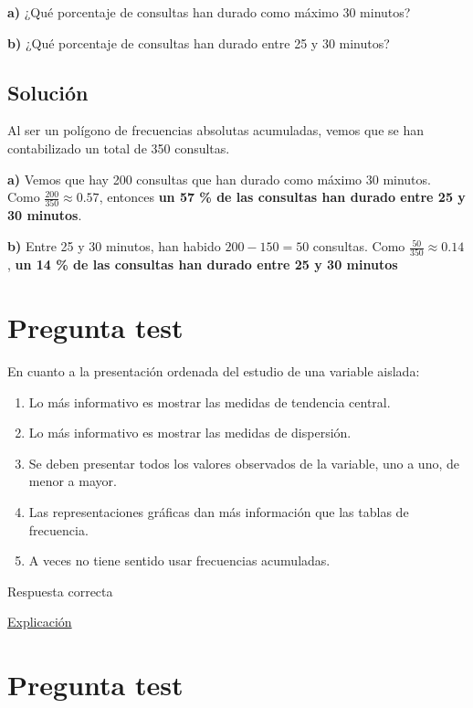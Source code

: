 \documentclass[
]{book}
\providecommand{\tightlist}{%
  \setlength{\itemsep}{0pt}\setlength{\parskip}{0pt}}
\begin{document}
\textbf{a)} ¿Qué porcentaje de consultas han durado como máximo 30 minutos?

\textbf{b)} ¿Qué porcentaje de consultas han durado entre 25 y 30 minutos?

\hypertarget{soluciuxf3n-4}{%
\subsection{Solución}\label{soluciuxf3n-4}}

Al ser un polígono de frecuencias absolutas acumuladas, vemos que se han contabilizado un total de 350 consultas.

\textbf{a)} Vemos que hay 200 consultas que han durado como máximo 30 minutos. Como \(\frac{200}{350} \approx 0.57\), entonces \textbf{un 57 \% de las consultas han durado entre 25 y 30 minutos}.

\textbf{b)} Entre 25 y 30 minutos, han habido \(200 - 150 = 50\) consultas. Como \(\frac{50}{350} \approx 0.14\), \textbf{un 14 \% de las consultas han durado entre 25 y 30 minutos}

\hypertarget{pregunta-test-42}{%
\section{Pregunta test}\label{pregunta-test-42}}

En cuanto a la presentación ordenada del estudio de una variable aislada:

\begin{enumerate}
\def\labelenumi{\alph{enumi})}
\tightlist
\item
  Lo más informativo es mostrar las medidas de tendencia central.
\item
  Lo más informativo es mostrar las medidas de dispersión.
\item
  Se deben presentar todos los valores observados de la variable, uno a uno, de menor a mayor.
\item
  Las representaciones gráficas dan más información que las tablas de frecuencia.
\item
  A veces no tiene sentido usar frecuencias acumuladas.
\end{enumerate}

Respuesta correcta

\href{https://1fjmanzano.github.io/bioestadistica/otros-gra\%CC\%81ficos.html}{Explicación}

\hypertarget{pregunta-test-43}{%
\section{Pregunta test}\label{pregunta-test-43}}
\end{document}
